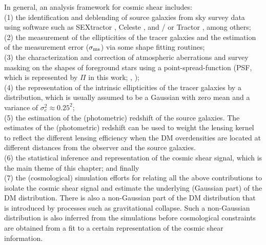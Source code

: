 In general, an analysis framework for cosmic shear includes: \\ 
(1) the identification and deblending of source galaxies from sky survey data 
using software such as {\sc SEXtractor} \citep{Bertin1996}, {\sc Celeste}
\citep{Regier2014}, and / or {\sc Tractor} \citep{Lang2010}, among others;\\
(2) the measurement of the ellipticities of the tracer galaxies  
and the estimation of the measurement error ($\sigma_{\rm
ms}$) via some shape fitting routines; \\
(3) the characterization and correction of atmospheric aberrations and survey masking 
on the shapes of foreground stars using
 a point-spread-function (PSF, which is represented by $\Pi$ in this work; \citealt{Jee2013a}, \citealt{Rowe2010}); \\
(4) the representation of the intrinsic ellipticities of the tracer galaxies by a
distribution, which is usually assumed to be a Gaussian with zero mean
and a variance of $\sigma_e^2 \approx 0.25^2$;\\ 
(5) the estimation of the (photometric) redshift of the source galaxies. The 
estimates of the (photometric) redshift can be used to weight the lensing kernel
to reflect the different lensing efficiency when the DM overdensities 
are located at different distances from the observer and the source galaxies.
\\
(6) the statistical inference and representation of the cosmic shear signal,
which is the main theme of this chapter;
and finally \\ 
(7) the (cosmological) simulation efforts for relating all the above contributions to isolate the cosmic shear signal and
estimate the underlying (Gaussian part) of the DM distribution. 
There is also a non-Gaussian part of the DM distribution that is introduced by processes
such as gravitational collapse. Such a non-Gaussian distribution 
is also inferred from the simulations before    
cosmological constraints are obtained from a fit to a certain representation of
the cosmic shear information. 

